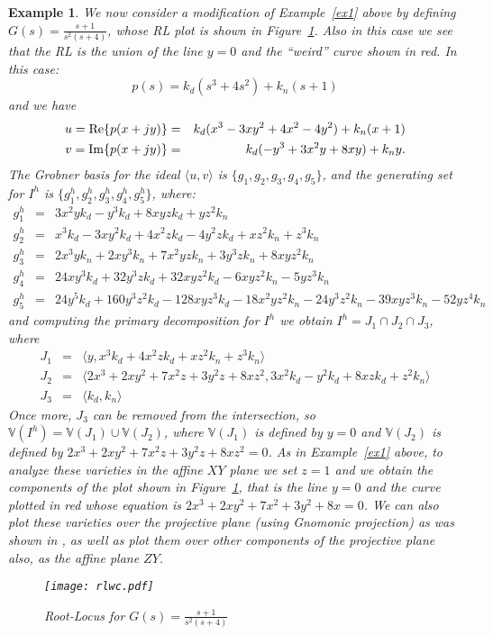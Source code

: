 \documentclass{article}
\newtheorem{example}{Example}[section]
\begin{document}
\begin{example} \em \label{ex2} We now consider a modification of Example~\ref{ex1} 
above by defining $\displaystyle G(s)=\frac{s+1}{s^2(s+4)}$, whose RL plot is shown in Figure~\ref{rlwc}. Also
in this case we see that the RL is the union of the line $y=0$ and the ``weird'' curve shown in red. In this case:
\[
p(s) = k_d(s^3+4s^2) + k_n(s+1)
\]
and we have 
\begin{eqnarray*}
u={\rm Re}\{p(x+jy)\} & = &k_d(x^3 -3xy^2 + 4x^2 - 4y^2) +k_n(x+1)\\
v={\rm Im}\{p(x+jy)\} & = &k_d(-y^3 + 3x^2y + 8xy) + k_ny.
\end{eqnarray*}
The Grobner basis for the ideal $\langle u,v\rangle$ is $\{g_1,g_2,g_3,g_4,g_5\}$, and the generating set for 
$I^h$ is $\{g_{1}^{h},g_{2}^{h},g_{3}^{h},g_{4}^{h},g_{5}^{h}\}$, where:
\begin{eqnarray*}
g_{1}^{h} & = & 3x^2yk_d - y^3k_d + 8xyzk_d + yz^2k_n\\
g_{2}^{h} & = & x^3k_d - 3xy^2k_d + 4x^2zk_d - 4y^2zk_d + xz^2k_n + z^3k_n\\
g_{3}^{h} & = & 2x^3yk_n + 2xy^3k_n + 7x^2yzk_n + 3y^3zk_n + 8xyz^2k_n \\
g_{4}^{h} & = & 24xy^3k_d + 32y^3zk_d + 32xyz^2k_d - 6xyz^2k_n - 5yz^3k_n \\
g_{5}^{h} & = & 24y^5k_d + 160y^3z^2k_d - 128xyz^3k_d - 18x^2yz^2k_n - 24y^3z^2k_n - 39xyz^3k_n - 52yz^4k_n
\end{eqnarray*}
and computing the primary decomposition for $I^h$ we obtain $I^h = J_1\cap J_2\cap J_3$, where
\begin{eqnarray}
J_1 & = & \langle y, x^3k_d + 4x^2zk_d + xz^2k_n + z^3k_n\rangle \label{j1ex2}\\
J_2 & = & \langle 2x^3 + 2xy^2 + 7x^2z + 3y^2z + 8xz^2, 3x^2k_d - y^2k_d + 8xzk_d + z^2k_n\rangle \label{j2ex2}\\
J_3 & = & \langle k_d, k_n\rangle \label{j3ex2}
\end{eqnarray}
Once more, $J_3$ can be removed from the intersection, so $\mathbb V(I^h)=\mathbb V(J_1)\cup \mathbb V(J_2)$,
where $\mathbb V(J_1)$ is defined by $y=0$ and $\mathbb V(J_2)$ is defined by 
$2x^3 + 2xy^2 + 7x^2z + 3y^2z + 8xz^2=0$. As in Example~\ref{ex1} above, to analyze
these varieties in the affine $XY$ plane we set $z=1$ and we obtain the components of the 
plot shown in Figure~\ref{rlwc}, that is the line $y=0$ and the curve plotted in red whose equation 
is $2x^3 + 2xy^2 + 7x^2 + 3y^2 + 8x=0$. We can also 
plot these varieties over the projective plane (using Gnomonic projection) as was shown in \cite{pjrl}, as well
as plot them over other components of the projective plane also, as the affine plane $ZY$.



\begin{figure}
\begin{center}
\texttt{[image: rlwc.pdf]} 
\caption{\label{rlwc} Root-Locus for $\displaystyle G(s)=\frac{s+1}{s^2(s+4)}$} 
\end{center}
\end{figure} 



\end{example}
\end{document}
